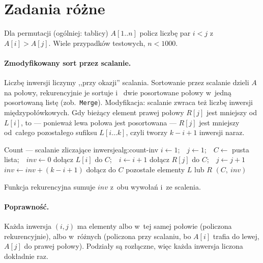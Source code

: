 \section{Zadania różne}

\begin{zadanie}
	Dla permutacji (ogólniej: tablicy) $A[1..n]$ policz liczbę par $i<j$
	z~$A[i]>A[j]$. Wiele przypadków testowych, $n<1000$.
\end{zadanie}

\paragraph{Zmodyfikowany sort przez scalanie.}
Liczbę inwersji liczymy ,,przy okazji'' scalania. Sortowanie przez scalanie
dzieli $A$ na połowy, rekurencyjnie je sortuje i~ dwie posortowane
połowy w~jedną posortowaną listę (zob.\ \texttt{Merge}). Modyfikacja: scalanie
zwraca też liczbę inwersji międzypołówkowych. Gdy bieżący element prawej połowy
$R[j]$ jest mniejszy od~$L[i]$, to --- ponieważ lewa połowa jest posortowana ---
$R[j]$ jest mniejszy od~całego pozostałego sufiksu $L[i\ldots k]$, czyli tworzy
$k-i+1$ inwersji naraz.

\begin{alg}{Count --- scalanie zliczające inwersje}{alg:count-inv}
	\State $i\gets 1$;\ \ $j\gets 1$;\ \ $C\gets$ pusta lista;\ \ $\mathit{inv}\gets 0$
	\State dołącz $L[i]$ do $C$;\ \ $i\gets i+1$
	\Else{}
	\State dołącz $R[j]$ do $C$;\ \ $j\gets j+1$
	\State $\mathit{inv}\gets \mathit{inv}+(k-i+1)$
	\EndIf
	\EndWhile
	\State dołącz do $C$ pozostałe elementy $L$ lub $R$
	\State \Return $(C,\ \mathit{inv})$
	\EndFunction
\end{alg}
\noindent Funkcja rekurencyjna sumuje $\mathit{inv}$ z~obu wywołań i~ze scalenia.

\paragraph{Poprawność.}
Każda inwersja $(i,j)$ ma elementy albo w~tej samej połowie (policzona
rekurencyjnie), albo w~różnych (policzona przy scalaniu, bo $A[i]$ trafia do
lewej, $A[j]$ do prawej połowy). Podziały są rozłączne, więc każda inwersja
liczona dokładnie raz.

